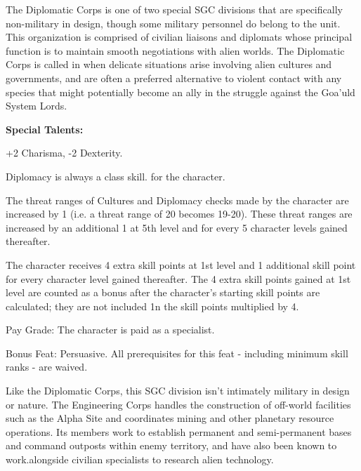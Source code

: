 The Diplomatic Corps is one of two special SGC divisions that are specifically non-military in design, though some military personnel do belong to the unit. This organization is comprised of civilian liaisons and diplomats whose principal function is to maintain smooth negotiations with alien worlds. The Diplomatic Corps is called in when delicate situations arise involving alien cultures and governments, and are often a preferred alternative to violent contact with any species that might potentially become an ally in the struggle against the Goa'uld System Lords.

\textbf{Special Talents:}
\begin{itemize*}
\item +2 Charisma, -2 Dexterity.
\item Diplomacy is always a class skill. for the character.
\item The threat ranges of Cultures and Diplomacy checks made by the character are increased by 1 (i.e. a threat range of 20 becomes 19-20). These threat ranges are increased by an additional 1 at 5th level and for every 5 character levels gained thereafter.
\item The character receives 4 extra skill points at 1st level and 1 additional skill point for every character level gained thereafter. The 4 extra skill points gained at 1st level are counted as a bonus after the character's starting skill points are calculated; they are not included 1n the skill points multiplied by 4.
\item Pay Grade: The character is paid as a specialist.
\item Bonus Feat: Persuasive. All prerequisites for this feat - including minimum skill ranks - are waived.
\end{itemize*}

Like the Diplomatic Corps, this SGC division isn't intimately military in design or nature. The Engineering Corps handles the construction of off-world facilities such as the Alpha Site and coordinates mining and other planetary resource operations. Its members work to establish permanent and semi-permanent bases and command outposts within enemy territory, and have also been known to work.alongside civilian specialists to research alien technology.

